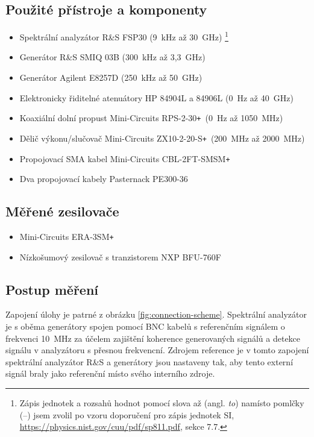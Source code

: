 \documentclass[11pt,a4paper]{article}
\newcommand{\plus}{{\texttt{+}}}
\begin{document}
\subsection*{Použité přístroje a komponenty}
\begin{itemize}
    \item Spektrální analyzátor R\&S FSP30 (9~kHz až 30~GHz)%
        \footnote{Zápis jednotek a rozsahů hodnot pomocí slova až (angl. \emph{to}) namísto pomlčky (--) jsem zvolil po vzoru doporučení pro zápis jednotek SI, \url{https://physics.nist.gov/cuu/pdf/sp811.pdf}, sekce 7.7.}
    \item Generátor R\&S SMIQ 03B (300~kHz až 3,3~GHz)
    \item Generátor Agilent E8257D (250~kHz až 50~GHz)
    \item Elektronicky řiditelné atenuátory HP 84904L a 84906L (0~Hz až 40~GHz)
    \item Koaxiální dolní propust Mini-Circuits RPS-2-30\plus~(0~Hz až 1050~MHz)
    \item Dělič výkonu/slučovač Mini-Circuits ZX10-2-20-S\plus~(200~MHz až 2000~MHz)
    \item Propojovací SMA kabel Mini-Circuits CBL-2FT-SMSM\plus
    \item Dva propojovací kabely Pasternack PE300-36
\end{itemize}


\subsection*{Měřené zesilovače}
\begin{itemize}
    \item Mini-Circuits ERA-3SM\plus
    \item Nízkošumový zesilovač s tranzistorem NXP BFU-760F
\end{itemize}

\subsection*{Postup měření}
Zapojení úlohy je patrné z obrázku \ref{fig:connection-scheme}. Spektrální analyzátor je s oběma generátory spojen pomocí BNC kabelů s referenčním signálem o frekvenci 10~MHz za účelem zajištění koherence generovaných signálů a detekce signálu v analyzátoru s přesnou frekvencní. Zdrojem reference je v tomto zapojení spektrální analyzátor R\&S a generátory jsou nastaveny tak, aby tento externí signál braly jako referenční místo svého interního zdroje.
\end{document}
